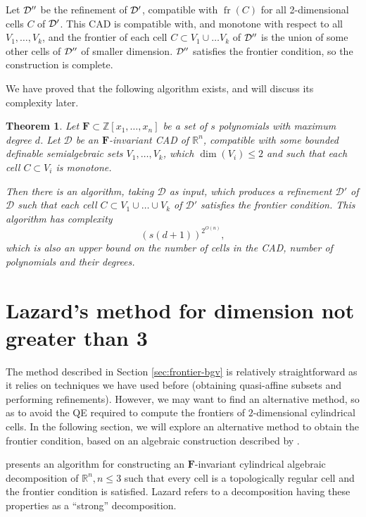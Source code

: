 \documentclass[
]{book}
\newtheorem{theorem}{Theorem}[chapter]
\theoremstyle{definition}
\theoremstyle{definition}
\theoremstyle{definition}
\theoremstyle{definition}
\theoremstyle{remark}
\begin{document}
Let \(\cal D''\) be the refinement of \(\cal D'\), compatible with \({\operatorname{fr} \left( C \right)}\) for all 2-dimensional cells \(C\) of \(\cal D'\). This CAD is compatible with, and monotone with respect to all \(V_1,\ldots,V_k\), and the frontier of each cell \(C \subset V_1\cup \ldots V_k\) of \(\cal D''\) is the union of some other cells of \(\cal D''\) of smaller dimension.
\(\cal D''\) satisfies the frontier condition, so the construction is complete.

We have proved that the following algorithm exists, and will discuss its complexity later.

\begin{theorem}
\protect\hypertarget{thm:lazard-rn}{}\label{thm:lazard-rn}Let \(\mathbf{F} \subset \mathbb{Z}[x_1,\ldots,x_n]\) be a set of \(s\) polynomials with maximum degree \(d\).
Let \(\mathcal{D}\) be an \(\mathbf{F}\)-invariant CAD of \(\mathbb{R}^n\), compatible with some bounded definable semialgebraic sets \(V_1,\ldots,V_k\), which \(\dim(V_i) \le 2\) and such that each cell \(C \subset V_i\) is monotone.

Then there is an algorithm, taking \(\mathcal{D}\) as input, which produces a refinement \(\mathcal{D'}\) of \(\mathcal{D}\) such that each cell \(C \subset V_1\cup\ldots\cup V_k\) of \(\mathcal{D'}\) satisfies the frontier condition.
This algorithm has complexity
\[
\left(s\left(d+1\right)\right)^{2^{O(n)}},
\]
which is also an upper bound on the number of cells in the CAD, number of polynomials and their degrees.
\end{theorem}

\hypertarget{sec:lazard-3}{%
\section{Lazard's method for dimension not greater than 3}\label{sec:lazard-3}}

The method described in Section \ref{sec:frontier-bgv} is relatively straightforward as it relies on techniques we have used before (obtaining quasi-affine subsets and performing refinements). However, we may want to find an alternative method, so as to avoid the QE required to compute the frontiers of \(2\)-dimensional cylindrical cells.
In the following section, we will explore an alternative method to obtain the frontier condition, based on an algebraic construction described by \citet{lazard10}.

\citet{lazard10} presents an algorithm for constructing an \(\mathbf{F}\)-invariant cylindrical algebraic decomposition of \(\mathbb{R}^n, n\le 3\) such that every cell is a topologically regular cell and the frontier condition is satisfied.
Lazard refers to a decomposition having these properties as a ``strong'' decomposition.
\end{document}

